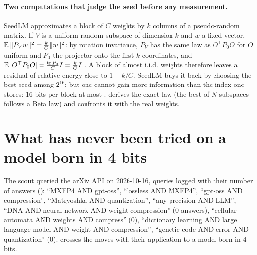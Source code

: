 \paragraph{Two computations that judge the seed before any measurement.} SeedLM approximates a block of $C$ weights by $k$ columns of a pseudo-random matrix. If $V$ is a uniform random subspace of dimension $k$ and $w$ a fixed vector, $\mathbb{E}\,\|P_V w\|^2 = \frac{k}{C}\|w\|^2$: by rotation invariance, $P_V$ has the same law as $O^\top P_0 O$ for $O$ uniform and $P_0$ the projector onto the first $k$ coordinates, and $\mathbb{E}\,[O^\top P_0 O] = \frac{\mathrm{tr}\,P_0}{C} I = \frac{k}{C} I$ \calc. A block of almost i.i.d. weights therefore leaves a residual of relative energy close to $1 - k/C$. SeedLM buys it back by choosing the best seed among $2^{16}$; but one cannot gain more information than the index one stores: 16 bits per block at most \calc.  derives the exact law (the best of $N$ subspaces follows a Beta law) and confronts it with the real weights.

\section{What has never been tried on a model born in 4 bits}\label{t3que:sec:case}

The scout queried the arXiv API on 2026-10-16, queries logged with their number of answers (): ``MXFP4 AND gpt-oss'', ``lossless AND MXFP4'', ``gpt-oss AND compression'', ``Matryoshka AND quantization'', ``any-precision AND LLM'', ``DNA AND neural network AND weight compression'' (0 answers), ``cellular automata AND weights AND compress'' (0), ``dictionary learning AND large language model AND weight AND compression'', ``genetic code AND error AND quantization'' (0).  crosses the moves with their application to a model born in 4 bits.

